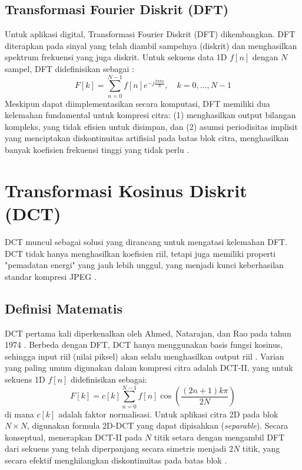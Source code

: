 \documentclass[a4paper]{article}
\begin{document}
\subsection{Transformasi Fourier Diskrit (DFT)}
Untuk aplikasi digital, Transformasi Fourier Diskrit (DFT) dikembangkan. DFT diterapkan pada sinyal yang telah diambil sampelnya (diskrit) dan menghasilkan spektrum frekuensi yang juga diskrit. Untuk sekuens data 1D $f[n]$ dengan $N$ sampel, DFT didefinisikan sebagai \cite{oppenheim1996signals}:
\begin{equation} \label{eq:dft_1d}
  F[k] = \sum_{n=0}^{N-1} f[n] e^{-j\frac{2\pi kn}{N}}, \quad k = 0, \dots, N-1
\end{equation}
Meskipun dapat diimplementasikan secara komputasi, DFT memiliki dua kelemahan fundamental untuk kompresi citra: (1) menghasilkan output bilangan kompleks, yang tidak efisien untuk disimpan, dan (2) asumsi periodisitas implisit yang menciptakan diskontinuitas artifisial pada batas blok citra, menghasilkan banyak koefisien frekuensi tinggi yang tidak perlu \cite{ucsd_dct_notes}.

\section{Transformasi Kosinus Diskrit (DCT)}
DCT muncul sebagai solusi yang dirancang untuk mengatasi kelemahan DFT. DCT tidak hanya menghasilkan koefisien riil, tetapi juga memiliki properti "pemadatan energi" yang jauh lebih unggul, yang menjadi kunci keberhasilan standar kompresi JPEG \cite{wallace1991jpeg}.

\subsection{Definisi Matematis}
DCT pertama kali diperkenalkan oleh Ahmed, Natarajan, dan Rao pada tahun 1974 \cite{ahmed1974dct}. Berbeda dengan DFT, DCT hanya menggunakan basis fungsi kosinus, sehingga input riil (nilai piksel) akan selalu menghasilkan output riil \cite{ucsd_dct_notes}. Varian yang paling umum digunakan dalam kompresi citra adalah DCT-II, yang untuk sekuens 1D $f[n]$ didefinisikan sebagai:
\begin{equation} \label{eq:dct_1d}
  F[k] = c[k] \sum_{n=0}^{N-1} f[n] \cos\left(\frac{(2n+1)k\pi}{2N}\right)
\end{equation}
di mana $c[k]$ adalah faktor normalisasi. Untuk aplikasi citra 2D pada blok $N \times N$, digunakan formula 2D-DCT yang dapat dipisahkan (\textit{separable}). Secara konseptual, menerapkan DCT-II pada $N$ titik setara dengan mengambil DFT dari sekuens yang telah diperpanjang secara simetris menjadi $2N$ titik, yang secara efektif menghilangkan diskontinuitas pada batas blok \cite{ucsd_dct_notes}.
\end{document}

